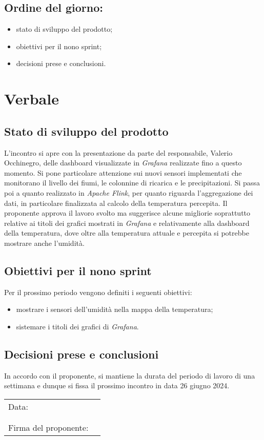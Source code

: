 \documentclass[italian,12pt]{article}
\begin{document}
\subsection*{Ordine del giorno:}
\begin{itemize}
	\item stato di sviluppo del prodotto;
	\item obiettivi per il nono sprint;
	\item decisioni prese e conclusioni.
\end{itemize}

\newpage

\section{Verbale}

\subsection{Stato di sviluppo del prodotto}
L'incontro si apre con la presentazione da parte del responsabile, Valerio Occhinegro, delle dashboard visualizzate in \textit{Grafana} realizzate fino a questo momento. Si pone particolare attenzione sui nuovi sensori implementati che monitorano il livello dei fiumi, le colonnine di ricarica e le precipitazioni. Si passa poi a quanto realizzato in \textit{Apache Flink}, per quanto riguarda l'aggregazione dei dati, in particolare finalizzata al calcolo della temperatura percepita. Il proponente approva il lavoro svolto ma suggerisce alcune migliorie soprattutto relative ai titoli dei grafici mostrati in \textit{Grafana} e relativamente alla dashboard della temperatura, dove oltre alla temperatura attuale e percepita si potrebbe mostrare anche l'umidità.

\subsection{Obiettivi per il nono sprint}
Per il prossimo periodo vengono definiti i seguenti obiettivi:
\begin{itemize}
	\item mostrare i sensori dell'umidità nella mappa della temperatura;
	\item sistemare i titoli dei grafici di \textit{Grafana}.
\end{itemize}

\subsection{Decisioni prese e conclusioni}
In accordo con il proponente, si mantiene la durata del periodo di lavoro di una settimana e dunque si fissa il prossimo incontro in data
26 giugno 2024.

\begin{table}[b]
	\begin{tabular}{@{}p{5cm}p{10cm}@{}}
		Data:                 & \hrulefill \\
		                      &            \\
		                      &            \\
		Firma del proponente: & \hrulefill \\
	\end{tabular}
\end{table}
\end{document}
